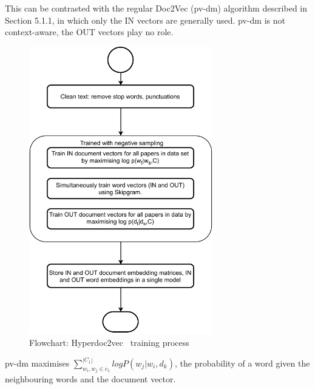 This can be contrasted with the regular Doc2Vec (pv-dm) algorithm described in Section 5.1.1, in which only the IN vectors are generally used. pv-dm is not context-aware, the OUT vectors play no role. 
\begin{figure}
\centering
 \includegraphics[keepaspectratio, width=8cm]{figures/Approach/hd2vtrainflowchart.pdf}
  \caption{Flowchart: Hyperdoc2vec~\cite{ShiSZZH18} training process}
  \label{fig:hd2vtraining}
\end{figure}
pv-dm maximises $\sum\limits_{w_i, w_j \in c_1}^{|C_1|} log P(w_j|{w_i, d_k})$, the probability of a word given the neighbouring words and the document vector. 

